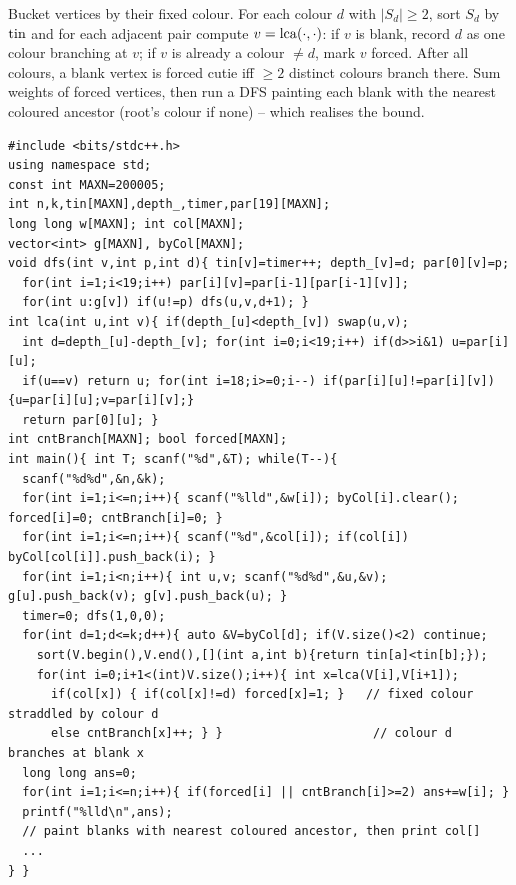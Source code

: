 Bucket vertices by their fixed colour.  For each colour \(d\) with \(|S_d|\ge2\), sort
\(S_d\) by \(\operatorname{tin}\) and for each adjacent pair compute \(v=\operatorname{lca}(\cdot,\cdot)\): if \(v\)
is blank, record \(d\) as one colour branching at \(v\); if \(v\) is already a colour
\(\ne d\), mark \(v\) forced.  After all colours, a blank vertex is forced cutie iff
\(\ge2\) distinct colours branch there.  Sum weights of forced vertices, then run a
DFS painting each blank with the nearest coloured ancestor (root's colour if none) --
which realises the bound.

\begin{lstlisting}[caption={CF 2127E via per-colour virtual trees. bucket by colour, sort each bucket by tin, take adjacent LCAs, and tally the colours branching at each blank vertex; forced = fixed-colour straddle OR >=2 branching colours. ASCII only}, label={lst:c30-ancient}]
#include <bits/stdc++.h>
using namespace std;
const int MAXN=200005;
int n,k,tin[MAXN],depth_,timer,par[19][MAXN];
long long w[MAXN]; int col[MAXN];
vector<int> g[MAXN], byCol[MAXN];
void dfs(int v,int p,int d){ tin[v]=timer++; depth_[v]=d; par[0][v]=p;
  for(int i=1;i<19;i++) par[i][v]=par[i-1][par[i-1][v]];
  for(int u:g[v]) if(u!=p) dfs(u,v,d+1); }
int lca(int u,int v){ if(depth_[u]<depth_[v]) swap(u,v);
  int d=depth_[u]-depth_[v]; for(int i=0;i<19;i++) if(d>>i&1) u=par[i][u];
  if(u==v) return u; for(int i=18;i>=0;i--) if(par[i][u]!=par[i][v]){u=par[i][u];v=par[i][v];}
  return par[0][u]; }
int cntBranch[MAXN]; bool forced[MAXN];
int main(){ int T; scanf("%d",&T); while(T--){
  scanf("%d%d",&n,&k);
  for(int i=1;i<=n;i++){ scanf("%lld",&w[i]); byCol[i].clear(); forced[i]=0; cntBranch[i]=0; }
  for(int i=1;i<=n;i++){ scanf("%d",&col[i]); if(col[i]) byCol[col[i]].push_back(i); }
  for(int i=1;i<n;i++){ int u,v; scanf("%d%d",&u,&v); g[u].push_back(v); g[v].push_back(u); }
  timer=0; dfs(1,0,0);
  for(int d=1;d<=k;d++){ auto &V=byCol[d]; if(V.size()<2) continue;
    sort(V.begin(),V.end(),[](int a,int b){return tin[a]<tin[b];});
    for(int i=0;i+1<(int)V.size();i++){ int x=lca(V[i],V[i+1]);
      if(col[x]) { if(col[x]!=d) forced[x]=1; }   // fixed colour straddled by colour d
      else cntBranch[x]++; } }                     // colour d branches at blank x
  long long ans=0;
  for(int i=1;i<=n;i++){ if(forced[i] || cntBranch[i]>=2) ans+=w[i]; }
  printf("%lld\n",ans);
  // paint blanks with nearest coloured ancestor, then print col[]
  ...
} }
\end{lstlisting}

